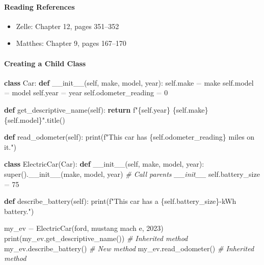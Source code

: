 \documentclass[
  justified,
  openright,
]{tufte-book}
\let\subsection\paragraph
\let\paragraph\paragraph
\newcommand{\KeywordTok}[1]{\textcolor{CodeKeyword}{\textbf{#1}}}  %
\newcommand{\StringTok}[1]{\textcolor{CodeString}{#1}}              %
\newcommand{\CommentTok}[1]{\textcolor{CodeComment}{\textit{#1}}}  %
\newcommand{\CodeNumTok}[1]{\textcolor{CodeNumber}{#1}}             %
\newcommand{\CodeFuncTok}[1]{\textcolor{CodeKeyword}{#1}}           %
\newcommand{\OperatorTok}[1]{\textcolor{DarkGray}{#1}}              %
\newenvironment{Shaded}{%
  \begin{mdframed}[style=TufteCode]%
}{%
  \end{mdframed}%
}
\let\subsection\paragraph
\let\paragraph\paragraph
\providecommand{\tightlist}{%
  \setlength{\itemsep}{0pt}\setlength{\parskip}{0pt}}
\begin{document}
\subsection{Reading References}\label{reading-references-22}

\begin{itemize}
\tightlist
\item
  Zelle: Chapter 12, pages 351--352
\item
  Matthes: Chapter 9, pages 167--170
\end{itemize}

\subsection{Creating a Child Class}\label{creating-a-child-class}

\begin{Shaded}
\begin{Highlighting}[]
\KeywordTok{class} Car:
    \KeywordTok{def} \CodeFuncTok{\_\_init\_\_}(self, make, model, year):
        self.make \OperatorTok{=} make
        self.model \OperatorTok{=} model
        self.year \OperatorTok{=} year
        self.odometer\_reading \OperatorTok{=} \CodeNumTok{0}
 
    \KeywordTok{def} get\_descriptive\_name(self):
        \KeywordTok{return} \StringTok{f"}\StringTok{\{}self\StringTok{.}year\StringTok{\}}\StringTok{ }\StringTok{\{}self\StringTok{.}make\StringTok{\}}\StringTok{ }\StringTok{\{}self\StringTok{.}model\StringTok{\}}\StringTok{"}.title()
 
    \KeywordTok{def} read\_odometer(self):
        print(\StringTok{f"This car has }\StringTok{\{}self\StringTok{.}odometer\_reading\StringTok{\}}\StringTok{ miles on it."})
 
 
\KeywordTok{class} ElectricCar(Car):
    \KeywordTok{def} \CodeFuncTok{\_\_init\_\_}(self, make, model, year):
        super().\CodeFuncTok{\_\_init\_\_}(make, model, year)   \CommentTok{\# Call parent\textquotesingle{}s \_\_init\_\_}
        self.battery\_size \OperatorTok{=} \CodeNumTok{75}
 
    \KeywordTok{def} describe\_battery(self):
        print(\StringTok{f"This car has a }\StringTok{\{}self\StringTok{.}battery\_size\StringTok{\}}\StringTok{{-}kWh battery."})
 
 
my\_ev \OperatorTok{=} ElectricCar(\StringTok{\textquotesingle{}ford\textquotesingle{}}, \StringTok{\textquotesingle{}mustang mach e\textquotesingle{}}, \CodeNumTok{2023})
print(my\_ev.get\_descriptive\_name())   \CommentTok{\# Inherited method}
my\_ev.describe\_battery()              \CommentTok{\# New method}
my\_ev.read\_odometer()                 \CommentTok{\# Inherited method}
\end{Highlighting}
\end{Shaded}
\end{document}
